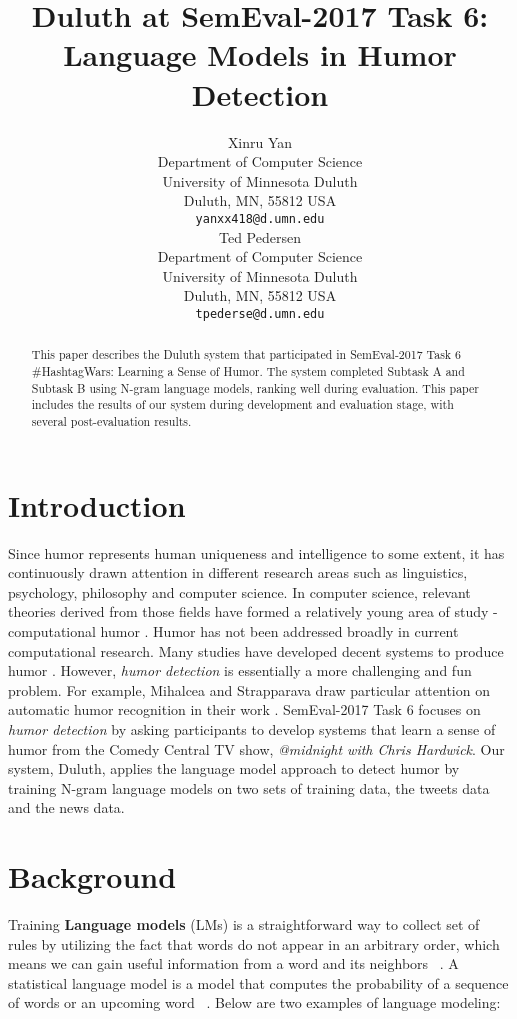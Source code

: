 \documentclass[11pt,a4paper]{article}
\title{Duluth at SemEval-2017 Task 6:  Language Models in Humor Detection}
\author{Xinru Yan \\
  Department of Computer Science \\ University of Minnesota Duluth \\ Duluth, MN, 55812 USA \\
  {\tt yanxx418@d.umn.edu} \\\And
  Ted Pedersen \\
  Department of Computer Science \\ University of Minnesota Duluth \\ Duluth, MN, 55812 USA \\
  {\tt tpederse@d.umn.edu} \\}
\date{}
\begin{document}
\maketitle
\begin{abstract}
  This paper describes the Duluth system that participated in SemEval-2017 Task 6 \#HashtagWars: Learning a Sense of Humor. The system completed Subtask A and Subtask B using N-gram language models, ranking well during evaluation. This paper includes the results of our system during development and evaluation stage, with several post-evaluation results. 
\end{abstract}

\section{Introduction}
Since humor represents human uniqueness and intelligence to some extent, it has continuously drawn attention in different research areas such as linguistics, psychology, philosophy and computer science. In computer science, relevant theories derived from those fields have formed a relatively young area of study - computational humor \cite{Recognizing:Humor:On:Twitter}. Humor has not been addressed broadly in current computational research. Many studies have developed decent systems to produce humor \cite{ozbal2012computational}. However, \textit{humor detection} is essentially a more challenging and fun problem. For example, Mihalcea and Strapparava draw particular attention on automatic humor recognition in their work \cite{Learning:To:Laugh}. SemEval-2017 Task 6 focuses on \textit{humor detection} by asking participants to develop systems that learn a sense of humor from the Comedy Central TV show, \textit{@midnight with Chris Hardwick}. Our system, Duluth, applies the language model approach to detect humor by training N-gram language models on two sets of training data, the tweets data and the news data.


\section{Background}
Training \textbf{Language models} (LMs) is a straightforward way to collect set of rules by utilizing the fact that words do not appear in an arbitrary order, which means we can gain useful information from a word and its neighbors ~\cite{JM}. A statistical language model is a model that computes the probability of a sequence of words or an upcoming word ~\cite{JM}. Below are two examples of language modeling:
\end{document}
